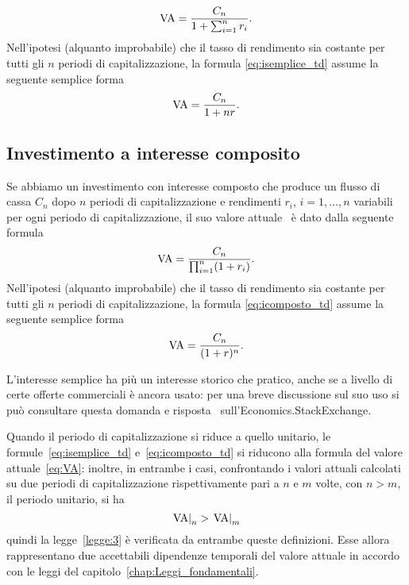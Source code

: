 \begin{equation}
  \label{eq:isemplice_td}
  \mathrm{VA}=\frac{C_n}{1+\sum_{i=1}^nr_i}.
\end{equation}
Nell'ipotesi (alquanto improbabile) che il tasso di rendimento sia costante per tutti gli $n$ periodi di capitalizzazione,
la formula \eqref{eq:isemplice_td} assume la seguente semplice forma
\[
  \mathrm{VA}=\frac{C_n}{1+nr}.
\]

\subsection{Investimento a interesse composito}
\label{sec:icomposto_td}

Se abbiamo un investimento con interesse composto che produce un flusso di cassa $C_n$ dopo $n$ periodi di capitalizzazione
e rendimenti $r_i$, $i= 1, \ldots, n$ variabili per ogni periodo di capitalizzazione, il suo valore attuale \VA\ è dato dalla
seguente formula
\begin{equation}
  \label{eq:icomposto_td}
  \mathrm{VA}=\frac{C_n}{\prod_{i=1}^n(1+r_i)}.
\end{equation}
Nell'ipotesi  (alquanto improbabile) che il tasso di rendimento sia costante per tutti gli $n$ periodi di capitalizzazione,
la formula \eqref{eq:icomposto_td} assume la seguente semplice forma
\[
  \mathrm{VA}=\frac{C_n}{(1+r)^n}.
\]

\begin{oss}\label{oss:isemplice}
  L'interesse semplice ha più un interesse storico che pratico, anche se a livello di certe offerte
  commerciali è ancora usato: per una breve discussione sul suo uso si può consultare questa domanda
  e risposta~\cite{Romanchuk2021} sull'Economics.StackExchange.
\end{oss}

\begin{oss}
  Quando il periodo di capitalizzazione si riduce a quello unitario, le formule~\eqref{eq:isemplice_td} e~\eqref{eq:icomposto_td}
  si riducono alla formula del valore attuale~\eqref{eq:VA}: inoltre, in entrambe i casi, confrontando i valori attuali
  calcolati su due periodi di capitalizzazione rispettivamente pari a $n$ e $m$ volte, con $n>m$, il periodo unitario, si ha
  \[
    \left.\mathrm{VA}\right|_{n}> \left.\mathrm{VA}\right|_{m}
  \]
  quindi la legge~\ref{legge:3} è verificata da entrambe queste definizioni. Esse allora rappresentano due accettabili
  dipendenze temporali del valore attuale in accordo con le leggi del capitolo~\ref{chap:Leggi_fondamentali}. 
\end{oss}

